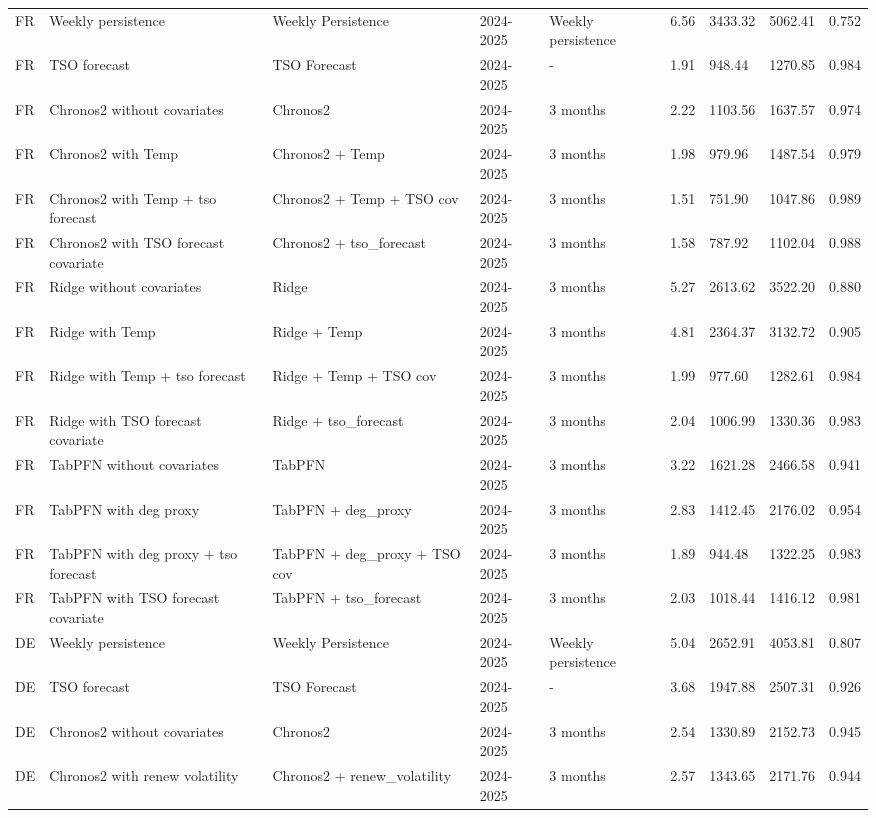 \begin{longtable}{lllllllll}
FR & Weekly persistence & Weekly Persistence & 2024-2025 & Weekly persistence & 6.56 & 3433.32 & 5062.41 & 0.752 \\
FR & TSO forecast & TSO Forecast & 2024-2025 & - & 1.91 & 948.44 & 1270.85 & 0.984 \\
FR & Chronos2 without covariates & Chronos2 & 2024-2025 & 3 months & 2.22 & 1103.56 & 1637.57 & 0.974 \\
FR & Chronos2 with Temp & Chronos2 + Temp & 2024-2025 & 3 months & 1.98 & 979.96 & 1487.54 & 0.979 \\
FR & Chronos2 with Temp + tso forecast & Chronos2 + Temp + TSO cov & 2024-2025 & 3 months & 1.51 & 751.90 & 1047.86 & 0.989 \\
FR & Chronos2 with TSO forecast covariate & Chronos2 + tso\_forecast & 2024-2025 & 3 months & 1.58 & 787.92 & 1102.04 & 0.988 \\
FR & Ridge without covariates & Ridge & 2024-2025 & 3 months & 5.27 & 2613.62 & 3522.20 & 0.880 \\
FR & Ridge with Temp & Ridge + Temp & 2024-2025 & 3 months & 4.81 & 2364.37 & 3132.72 & 0.905 \\
FR & Ridge with Temp + tso forecast & Ridge + Temp + TSO cov & 2024-2025 & 3 months & 1.99 & 977.60 & 1282.61 & 0.984 \\
FR & Ridge with TSO forecast covariate & Ridge + tso\_forecast & 2024-2025 & 3 months & 2.04 & 1006.99 & 1330.36 & 0.983 \\
FR & TabPFN without covariates & TabPFN & 2024-2025 & 3 months & 3.22 & 1621.28 & 2466.58 & 0.941 \\
FR & TabPFN with deg proxy & TabPFN + deg\_proxy & 2024-2025 & 3 months & 2.83 & 1412.45 & 2176.02 & 0.954 \\
FR & TabPFN with deg proxy + tso forecast & TabPFN + deg\_proxy + TSO cov & 2024-2025 & 3 months & 1.89 & 944.48 & 1322.25 & 0.983 \\
FR & TabPFN with TSO forecast covariate & TabPFN + tso\_forecast & 2024-2025 & 3 months & 2.03 & 1018.44 & 1416.12 & 0.981 \\
DE & Weekly persistence & Weekly Persistence & 2024-2025 & Weekly persistence & 5.04 & 2652.91 & 4053.81 & 0.807 \\
DE & TSO forecast & TSO Forecast & 2024-2025 & - & 3.68 & 1947.88 & 2507.31 & 0.926 \\
DE & Chronos2 without covariates & Chronos2 & 2024-2025 & 3 months & 2.54 & 1330.89 & 2152.73 & 0.945 \\
DE & Chronos2 with renew volatility & Chronos2 + renew\_volatility & 2024-2025 & 3 months & 2.57 & 1343.65 & 2171.76 & 0.944 \\

\end{longtable}

